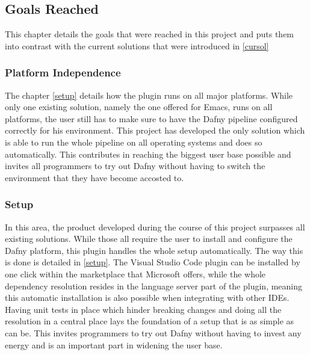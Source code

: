 \subsection{Goals Reached}
This chapter details the goals that were reached in this project and puts them into contrast with the current solutions that were introduced in \ref{cursol}
\subsubsection{Platform Independence}
The chapter \ref{setup} details how the plugin runs on all major platforms. While only one existing solution, namely the one offered for Emacs, runs on all platforms, the user still has to make sure to have the Dafny pipeline configured correctly for his environment. \newline
This project has developed the only solution which is able to run the whole pipeline on all operating systems and does so automatically. This contributes in reaching the biggest user base possible and invites all programmers to try out Dafny without having to switch the environment that they have become accosted to.  

\subsubsection{Setup}
In this area, the product developed during the course of this project surpasses all existing solutions. While those all require the user to install and configure the Dafny platform, this plugin handles the whole setup automatically. The way this is done is detailed in \ref{setup}. The Visual Studio Code plugin can be installed by one click within the marketplace that Microsoft offers, while the whole dependency resolution resides in the language server part of the plugin, meaning this automatic installation is also possible when integrating with other IDEs. \newline
Having unit tests in place which hinder breaking changes and doing all the resolution in a central place lays the foundation of a setup that is as simple as can be. This invites programmers to try out Dafny without having to invest any energy and is an important part in widening the user base. 

